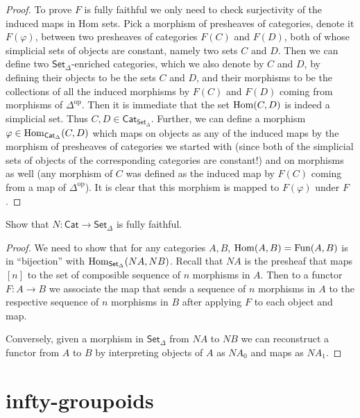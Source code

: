 \begin{proof}
To prove $F$ is fully faithful we only need
to check surjectivity of
the induced maps in Hom sets. Pick a morphism
of presheaves
of categories, denote it
$F(\varphi)$, between two presheaves of
categories $F(C)$ and  $F(D)$,
both of whose simplicial sets of objects are
constant, namely
two sets $C$ and $D$.
Then we can define two
$\mathsf{Set}_\Delta$-enriched categories,
which we also denote by $C$ and $D$,
by defining their objects to be the sets $C$
and $D$, and their morphisms to be
the collections of all the induced morphisms
by $F(C)$ and $F(D)$ coming from
morphisms of $\Delta^{\text{op}}$.
Then it is immediate that the set $\mathop{\mathrm{Hom}}\nolimits(C,D)$
is indeed a simplicial set.
Thus $C,D \in
\mathsf{Cat}_{\mathsf{Set}_\Delta}$. Further,
we
can define a morphism $\varphi \in
\mathop{\mathrm{Hom}}\nolimits_{\mathsf{Cat}_\Delta}(C,D)$
which maps on objects as any of the induced
maps by the morphism of presheaves
of categories we started with (since both of
the simplicial sets of objects
of the corresponding categories are
constant!)
and on morphisms as well (any morphism of $C$
was defined as the
induced map by $F(C)$ coming from a map of
$\Delta^{\text{op}}$).
It is clear that this morphism is mapped to
$F(\varphi)$ under $F$.
\end{proof}

\begin{exercise}[1.3]
\label{exercise-N-is-fully-faithful}
Show that
$N:\mathsf{Cat}\to\mathsf{Set}_\Delta$ is
fully faithful.
\end{exercise}

\begin{proof}
We need to show that for any categories
$A,B$,
$\mathop{\mathrm{Hom}}\nolimits(A,B)=\text{Fun}(A,B)$ is in
``bijection'' with
$\mathop{\mathrm{Hom}}\nolimits_{\mathsf{Set}_\Delta}(NA,NB)$.
Recall that
$NA$ is the presheaf that maps $[n]$ to
the set of composible sequence of $n$
morphisms in $A$.
Then to a functor $F:A \to B$ we associate
the
map that sends a sequence of $n$ morphisms in
$A$
to the respective sequence of $n$ morphisms
in $B$
after applying $F$ to each object and map.

Conversely, given a morphism in
$\mathsf{Set}_\Delta$
from $NA$ to $NB$
we can reconstruct a functor from $A$ to $B$
 by interpreting objects of $A$ as $NA_0$ and
maps as $NA_1$.
\end{proof}

\section{infty-groupoids}
\label{section-infty-groupoids}

